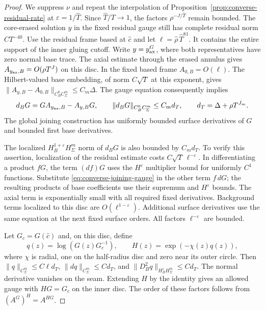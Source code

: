\documentclass[11pt]{amsart}
\theoremstyle{definition}
\theoremstyle{remark}
\theoremstyle{plain}
\begin{document}
\begin{proof}
We suppress $\nu$ and repeat the interpolation of
Proposition~\ref{prop:converse-residual-rate} at
$\varepsilon=1/\widehat T$. Since $\widehat T/T\to1$,
the factors $\rho^{-J/\widehat T}$ remain bounded.
The core-erased solution $y$ in the fixed residual gauge
still has complete residual norm $CT^{-40}$.
Use the residual frame based at $\widehat c$ and let
$\ell=\widehat\rho\,\widehat T^{81}$.
It contains the entire support of the inner gluing cutoff.
Write $y=y_{\rm ax}^G$, where both representatives have
zero normal base trace. The axial estimate through the
erased annulus gives
$A_{y_{\rm ax},B}=O(\rho T^J)$ on this disc.
In the fixed based frame $A_{0,B}=O(\ell)$.
The Hilbert-valued base embedding, of norm $C\sqrt T$
at this exponent, gives
$\|A_{y,B}-A_{0,B}\|_{C^0_BC_\Sigma^m}\leq C_m\Delta$.
The gauge equation consequently implies
\begin{equation}\label{eq:converse-joining-gauge}
 d_BG=G A_{y_{\rm ax},B}-A_{y,B}G,\qquad
 \|d_BG\|_{C^0_BC_\Sigma^m}\leq C_m d_T,\qquad
 d_T=\Delta+\rho T^{J_m}.
\end{equation}
The global joining construction has uniformly bounded
surface derivatives of $G$ and bounded first base derivatives.

The localized $H_B^{1+\varepsilon}H_\Sigma^m$ norm of
$d_BG$ is also bounded by $C_md_T$.
To verify this assertion, localization of the residual
estimate costs $C\sqrt T\,\ell^{-\varepsilon}$.
In differentiating a product $fG$, the term $(df)G$
uses the $H^\varepsilon$ multiplier bound for uniformly
$C^1$ functions. Substitute \eqref{eq:converse-joining-gauge}
in the other term $f\,dG$; the resulting products of base
coefficients use their supremum and $H^\varepsilon$ bounds.
The axial term is exponentially small with all required
fixed derivatives. Background terms localized to this disc
are $O(\ell^{1-\varepsilon})$. Additional surface derivatives
use the same equation at the next fixed surface orders.
All factors $\ell^{-\varepsilon}$ are bounded.

Let $G_c=G(\widehat c)$ and, on this disc, define
\[
 q(z)=\log(G(z)G_c^{-1}),\qquad H(z)=\exp(-\chi(z)q(z)),
\]
where $\chi$ is radial, one on the half-radius disc and
zero near its outer circle. Then
$\|q\|_{C_\Sigma^m}\leq C\ell d_T$,
$\|dq\|_{C_\Sigma^m}\leq Cd_T$, and
$\|D_B^2q\|_{H^\varepsilon_BH_\Sigma^m}\leq Cd_T$.
The normal derivative vanishes on the seam. Extending $H$
by the identity gives an allowed gauge with $HG=G_c$
on the inner disc. The order of these factors follows
from $(A^G)^H=A^{HG}$.


\end{proof}
\end{document}
